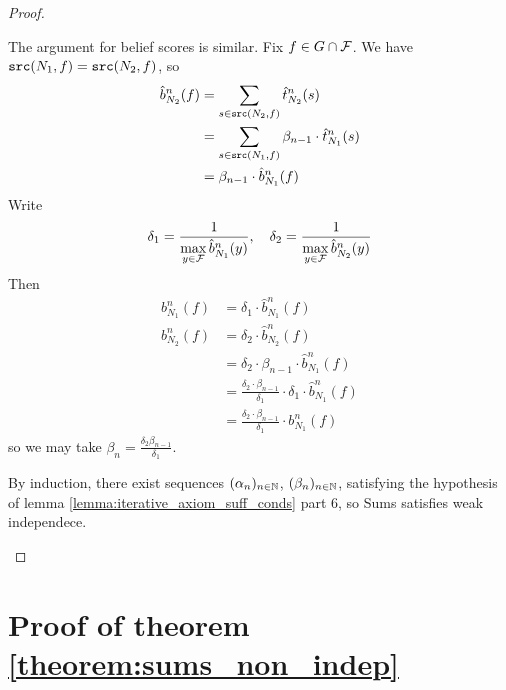 \documentclass[../main.tex]{subfiles}
\begin{document}
\begin{proof}
\begin{enumerate}
The argument for belief scores is similar. Fix $f \in G \cap \mathcal{F}$. We have
$\texttt{src}(N_1, f) = \texttt{src}(N_2, f)$, so
\begin{align*}
    \hat{b}_{N_2}^n(f) & = \sum_{s \in \texttt{src}(N_2, f)}{\hat{t}_{N_2}^n(s)} \\
       & = \sum_{s \in \texttt{src}(N_1, f)}{\beta_{n-1} \cdot \hat{t}_{N_1}^n(s)} \\
       & = \beta_{n-1} \cdot \hat{b}_{N_1}^n(f)
\end{align*}
Write
\[
    \delta_1 = \frac{1}{\max\limits_{y \in \mathcal{F}}{\hat{b}_{N_1}^n(y)}},
    \quad
    \delta_2 = \frac{1}{\max\limits_{y \in \mathcal{F}}{\hat{b}_{N_2}^n(y)}}
\]
Then
\begin{align*}
    b_{N_1}^n(f) & = \delta_1 \cdot \hat{b}_{N_1}^n(f) \\
    b_{N_2}^n(f) & = \delta_2 \cdot \hat{b}_{N_2}^n(f) \\
     & = \delta_2 \cdot \beta_{n - 1} \cdot \hat{b}_{N_1}^n(f) \\
     & = \frac{\delta_2 \cdot \beta_{n - 1}}{\delta_1} \cdot \delta_1 \cdot \hat{b}_{N_1}^n(f) \\
     & = \frac{\delta_2 \cdot \beta_{n - 1}}{\delta_1} \cdot b_{N_1}^n(f)
\end{align*}
so we may take $\beta_n = \frac{\delta_2\beta_{n-1}}{\delta_1}$.

By induction, there exist sequences $(\alpha_n)_{n \in \mathbb{N}}$, $(\beta_n)_{n
\in \mathbb{N}}$, satisfying the hypothesis of lemma
\ref{lemma:iterative_axiom_suff_conds} part 6, so Sums satisfies weak
independece.

\end{enumerate}

\end{proof}

\section{Proof of theorem \ref{theorem:sums_non_indep}}
\end{document}
